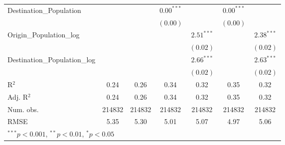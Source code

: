 \begin{table}
\begin{center}
\begin{tabular}{l c c c c c c }
			Destination\_Population      &               &               & $0.00^{***}$  &                & $0.00^{***}$  &                \\
			&               &               & $(0.00)$      &                & $(0.00)$      &                \\
			Origin\_Population\_log      &               &               &               & $2.51^{***}$   &               & $2.38^{***}$   \\
			&               &               &               & $(0.02)$       &               & $(0.02)$       \\
			Destination\_Population\_log &               &               &               & $2.66^{***}$   &               & $2.63^{***}$   \\
			&               &               &               & $(0.02)$       &               & $(0.02)$       \\
			\hline
			R$^2$                        & 0.24          & 0.26          & 0.34          & 0.32           & 0.35          & 0.32           \\
			Adj. R$^2$                   & 0.24          & 0.26          & 0.34          & 0.32           & 0.35          & 0.32           \\
			Num. obs.                    & 214832        & 214832        & 214832        & 214832         & 214832        & 214832         \\
			RMSE                         & 5.35          & 5.30          & 5.01          & 5.07           & 4.97          & 5.06           \\
			\hline
			\multicolumn{7}{l}{\scriptsize{$^{***}p<0.001$, $^{**}p<0.01$, $^*p<0.05$}}
		\end{tabular}
		\label{table:Gravity2014Q4}
	\end{center}
\end{table}


